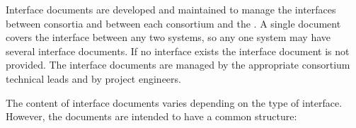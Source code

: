 Interface documents are developed and maintained to manage the
interfaces between consortia and between each consortium and the
. A single document covers the interface between any two
systems, so any one system may have several interface documents. If no
interface exists the interface document is not provided.  The
interface documents are managed by the appropriate consortium
technical leads and by  project engineers.

The content of interface documents varies depending on the type
of interface. However, the documents are intended to have
a common structure: 
\begin{comment}  Too wordy, copied below. Anne
\begin{enumerate}
 \item Definition: This section defines the interfacing systems.
 \item Hardware: In this section, the interfacing hardware components,
   electrical and mechanical, are defined in general terms. As an
   example, the \dword{apa} frame needs to support the \dword{pd}
   mounting brackets.
 \item Design: In this section, the dependencies in design
   methodology, sequence, and standards are described. As with the
   previous example, the design of the \dword{pd} mounting
   brackets depends on side tubes chosen for the \dword{apa}.
 \item Production: Component production and overall assembly is
   shared among interfacing systems. This section details who has what
   responsibilities.
 \item Testing: Like production, testing is a shared
   responsibility. In this section, responsibilities for testing and
   the required equipment are apportioned.
 \item Integration: The integration of systems into installable units
   before insertion into the cryostat is defined in this section. The
   location, methodology, tooling, and environment for integration are
   defined.
 \item Installation: Installation tasks and responsibilities, once
   installable units are assembled, are defined in this section. Any
   special transportation or installation tool or fixture is also
   defined.
 \item Commissioning: In this section, overall responsibilities for
   commissioning tasks are defined, and parameters are set.
 \item Data format, control and error codes: Communications protocols,
   responses and necessary actions are defined.
 \item Appendices: Technical figures and interfaces should be included
   in this section in as much detail as necessary. Block diagrams that
   show interconnections and detailed documentation of each connection
   are needed.
\end{enumerate}
\end{comment}
